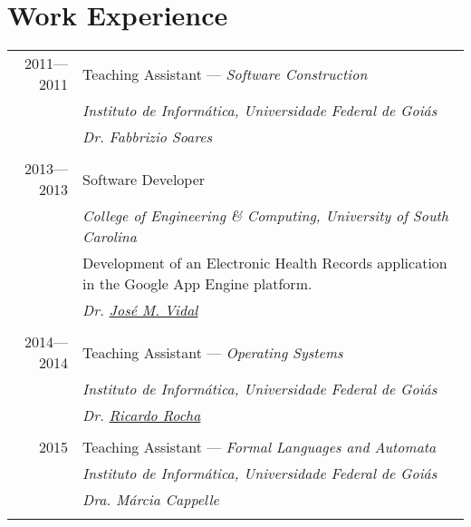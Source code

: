 \documentclass[a4paper,10pt]{article}
\begin{document}
\section{Work Experience}
\begin{tabular}{r|p{11cm}}

  \textsc{2011---2011}
  & Teaching Assistant --- \emph{Software Construction}\\
  &\emph{Instituto de Informática, Universidade Federal de Goiás}\\
  &\emph{Dr. Fabbrizio Soares}
  \\\multicolumn{2}{c}{} \\

  \textsc{2013---2013}
  & Software Developer\\
  &\emph{College of Engineering \& Computing, University of South Carolina}\\
  &\footnotesize{Development of an Electronic Health Records application in the Google App Engine platform.}\\
  &\emph{Dr. \href{http://jmvidal.cse.sc.edu}{José M. Vidal}}
  \\\multicolumn{2}{c}{} \\

  \textsc{2014---2014}
  & Teaching Assistant --- \emph{Operating Systems}\\
  &\emph{Instituto de Informática, Universidade Federal de Goiás}\\
  &\emph{Dr. \href{http://inf.ufg.br/~ricardo/}{Ricardo Rocha}}
  \\\multicolumn{2}{c}{} \\

  \textsc{2015}
  & Teaching Assistant --- \emph{Formal Languages and Automata}\\
  &\emph{Instituto de Informática, Universidade Federal de Goiás}\\
  &\emph{Dra. {Márcia Cappelle}}
  \\\multicolumn{2}{c}{} \\


\end{tabular}

\end{document}
